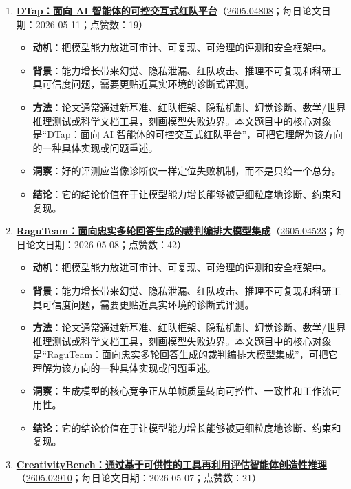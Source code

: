\begin{enumerate}[leftmargin=1.5em]
\begin{itemize}[leftmargin=1.5em]
  \end{itemize}
  \item \textbf{\href{https://huggingface.co/papers/2605.04808}{DTap：面向 AI 智能体的可控交互式红队平台}}（\href{https://arxiv.org/abs/2605.04808}{2605.04808}；每日论文日期：2026-05-11；点赞数：19）
  \begin{itemize}[leftmargin=1.5em]
    \item \textbf{动机}：把模型能力放进可审计、可复现、可治理的评测和安全框架中。
    \item \textbf{背景}：能力增长带来幻觉、隐私泄漏、红队攻击、推理不可复现和科研工具可信度问题，需要更贴近真实环境的诊断式评测。
    \item \textbf{方法}：论文通常通过新基准、红队框架、隐私机制、幻觉诊断、数学/世界推理测试或科学文档工具，刻画模型失败边界。本文题目中的核心对象是“DTap：面向 AI 智能体的可控交互式红队平台”，可把它理解为该方向的一种具体实现或问题重述。
    \item \textbf{洞察}：好的评测应当像诊断仪一样定位失败机制，而不是只给一个总分。
    \item \textbf{结论}：它的结论价值在于让模型能力增长能够被更细粒度地诊断、约束和复现。
  \end{itemize}
  \item \textbf{\href{https://huggingface.co/papers/2605.04523}{RaguTeam：面向忠实多轮回答生成的裁判编排大模型集成}}（\href{https://arxiv.org/abs/2605.04523}{2605.04523}；每日论文日期：2026-05-08；点赞数：42）
  \begin{itemize}[leftmargin=1.5em]
    \item \textbf{动机}：把模型能力放进可审计、可复现、可治理的评测和安全框架中。
    \item \textbf{背景}：能力增长带来幻觉、隐私泄漏、红队攻击、推理不可复现和科研工具可信度问题，需要更贴近真实环境的诊断式评测。
    \item \textbf{方法}：论文通常通过新基准、红队框架、隐私机制、幻觉诊断、数学/世界推理测试或科学文档工具，刻画模型失败边界。本文题目中的核心对象是“RaguTeam：面向忠实多轮回答生成的裁判编排大模型集成”，可把它理解为该方向的一种具体实现或问题重述。
    \item \textbf{洞察}：生成模型的核心竞争正从单帧质量转向可控性、一致性和工作流可用性。
    \item \textbf{结论}：它的结论价值在于让模型能力增长能够被更细粒度地诊断、约束和复现。
  \end{itemize}
  \item \textbf{\href{https://huggingface.co/papers/2605.02910}{CreativityBench：通过基于可供性的工具再利用评估智能体创造性推理}}（\href{https://arxiv.org/abs/2605.02910}{2605.02910}；每日论文日期：2026-05-07；点赞数：21）

\end{enumerate}
